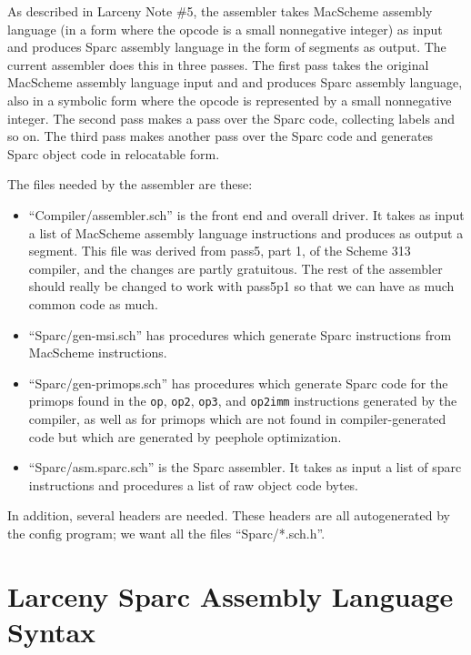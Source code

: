 As described in Larceny Note \#5, the assembler takes MacScheme
assembly language (in a form where the opcode is a small nonnegative
integer) as input and produces Sparc assembly language in the form of
segments as output. The current assembler does this in three passes.
The first pass takes the original MacScheme assembly language input
and and produces Sparc assembly language, also in a symbolic form
where the opcode is represented by a small nonnegative integer. The
second pass makes a pass over the Sparc code, collecting labels and so
on. The third pass makes another pass over the Sparc code and
generates Sparc object code in relocatable form.

The files needed by the assembler are these:

\begin{itemize}
\item
``Compiler/assembler.sch'' is the front end and overall driver. It takes as
input a list of MacScheme assembly language instructions and produces as
output a segment. This file was derived from pass5, part 1, of the Scheme 313
compiler, and the changes are partly gratuitous. The rest of the assembler
should really be changed to work with pass5p1 so that we can have as much
common code as much.

\item
``Sparc/gen-msi.sch'' has procedures which generate Sparc instructions from
MacScheme instructions.

\item
``Sparc/gen-primops.sch'' has procedures which generate Sparc code for
the primops found in the {\tt op}, {\tt op2}, {\tt op3}, and {\tt op2imm}
instructions generated by the compiler, as well as for primops which are
not found in compiler-generated code but which are generated by peephole
optimization.

\item
``Sparc/asm.sparc.sch'' is the Sparc assembler. It takes as input
a list of sparc instructions and procedures a list of raw object code bytes.

\end{itemize}

In addition, several headers are needed. These headers are all autogenerated
by the config program; we want all the files ``Sparc/*.sch.h''.

\section{Larceny Sparc Assembly Language Syntax}

